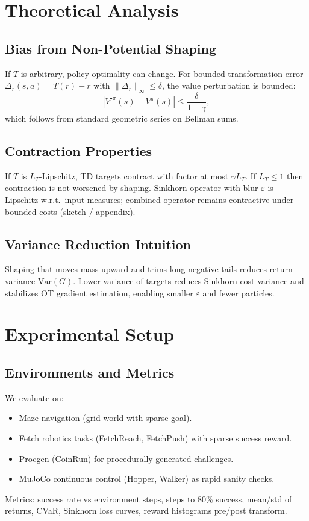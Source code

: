 \documentclass[10pt,twocolumn]{article}
\begin{document}
\section{Theoretical Analysis}
\subsection{Bias from Non-Potential Shaping}
If $T$ is arbitrary, policy optimality can change. For bounded transformation error $\Delta_r(s,a)=T(r)-r$ with $\|\Delta_r\|_\infty \le \delta$, the value perturbation is bounded:
\begin{equation}
|V'^\pi(s)-V^\pi(s)| \le \frac{\delta}{1-\gamma},
\label{eq:bias_bound}
\end{equation}
which follows from standard geometric series on Bellman sums.

\subsection{Contraction Properties}
If $T$ is $L_T$-Lipschitz, TD targets contract with factor at most $\gamma L_T$. If $L_T\le1$ then contraction is not worsened by shaping. Sinkhorn operator with blur $\varepsilon$ is Lipschitz w.r.t.\ input measures; combined operator remains contractive under bounded costs (sketch / appendix).

\subsection{Variance Reduction Intuition}
Shaping that moves mass upward and trims long negative tails reduces return variance $\mathrm{Var}(G)$. Lower variance of targets reduces Sinkhorn cost variance and stabilizes OT gradient estimation, enabling smaller $\varepsilon$ and fewer particles.

\section{Experimental Setup}
\subsection{Environments and Metrics}
We evaluate on:
\begin{itemize}
  \item Maze navigation (grid-world with sparse goal).
  \item Fetch robotics tasks (FetchReach, FetchPush) with sparse success reward.
  \item Procgen (CoinRun) for procedurally generated challenges.
  \item MuJoCo continuous control (Hopper, Walker) as rapid sanity checks.
\end{itemize}
Metrics: success rate vs environment steps, steps to 80\% success, mean/std of returns, CVaR, Sinkhorn loss curves, reward histograms pre/post transform.
\end{document}
